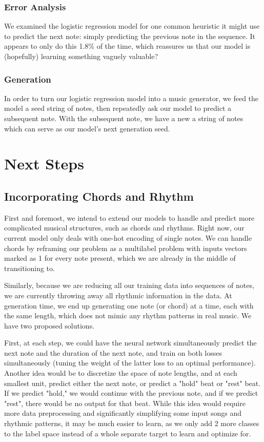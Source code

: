 \documentclass[twoside,twocolumn]{article}
\begin{document}
\subsubsection{Error Analysis}
We examined the logistic regression model for one common heuristic it might use to predict the next note: simply predicting the previous note in the sequence. It appears to only do this 1.8\% of the time, which reassures us that our model is (hopefully) learning something vaguely valuable?

\subsubsection{Generation}
In order to turn our logistic regression model into a music generator, we feed the model a seed string of notes, then repeatedly ask our model to predict a subsequent note. With the subsequent note, we have a new a string of notes which can serve as our model's next generation seed.


\section{Next Steps}

\subsection{Incorporating Chords and Rhythm}
First and foremost, we intend to extend our models to handle and predict more complicated musical structures, such as chords and rhythms. Right now, our current model only deals with one-hot encoding of single notes. We can handle chords by reframing our problem as a multilabel problem with inputs vectors marked as 1 for every note present, which we are already in the middle of transitioning to. 

Similarly, because we are reducing all our training data into sequences of notes, we are currently throwing away all rhythmic information in the data. At generation time, we end up generating one note (or chord) at a time, each with the same length, which does not mimic any rhythm patterns in real music. We have two proposed solutions. 

First, at each step, we could have the neural network simultaneously predict the next note and the duration of the next note, and train on both losses simultaneously (tuning the weight of the latter loss to an optimal performance). Another idea would be to discretize the space of note lengths, and at each smallest unit, predict either the next note, or predict a "hold" beat or "rest" beat. If we predict "hold," we would continue with the previous note, and if we predict "rest", there would be no output for that beat. While this idea would require more data preprocessing and significantly simplifying some input songs and rhythmic patterns, it may be much easier to learn, as we only add 2 more classes to the label space instead of a whole separate target to learn and optimize for.
\end{document}
